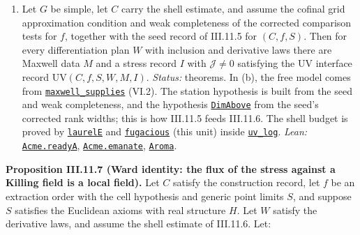 \documentclass[
  letterpaper,
  11pt]{article}
\providecommand{\tightlist}{%
  \setlength{\itemsep}{0pt}\setlength{\parskip}{0pt}}
\begin{document}
\begin{enumerate}
\def\labelenumi{(\alph{enumi})}
\setcounter{enumi}{1}
\tightlist
\item
  Let \(G\) be simple, let \(C\) carry the shell estimate, and assume
  the cofinal grid approximation condition and weak completeness of the
  corrected comparison tests for \(f\), together with the seed record of
  III.11.5 for \((C,f,S)\). Then for every differentiation plan \(W\)
  with inclusion and derivative laws there are Maxwell data \(M\) and a
  stress record \(I\) with \(\mathcal J\ne0\) satisfying the UV
  interface record \(\mathrm{UV}(C,f,S,W,M,I)\). \emph{Status:}
  theorems. In (b), the free model comes from
  \href{https://github.com/yang-mills-group/OpenAI-YM-20261028/blob/3456e5e75cf8d4cd558955a5c7638fba2d68f464/YM/Next/MAXWELL/Lit.lean\#L45-L48}{\texttt{maxwell\_supplies}}
  (VI.2). The station hypothesis is built from the seed and weak
  completeness, and the hypothesis
  \href{https://github.com/yang-mills-group/OpenAI-YM-20261028/blob/3456e5e75cf8d4cd558955a5c7638fba2d68f464/YM/Next/UV_STRESS/Invert.lean\#L108}{\texttt{DimAbove}}
  from the seed's corrected rank widths; this is how III.11.5 feeds
  III.11.6. The shell budget is proved by
  \href{https://github.com/yang-mills-group/OpenAI-YM-20261028/blob/3456e5e75cf8d4cd558955a5c7638fba2d68f464/YM/MergeProof/North/Economist.lean\#L23-L32}{\texttt{laurelE}}
  and
  \href{https://github.com/yang-mills-group/OpenAI-YM-20261028/blob/3456e5e75cf8d4cd558955a5c7638fba2d68f464/YM/MergeProof/North/Economist.lean\#L34}{\texttt{fugacious}}
  (this unit) inside
  \href{https://github.com/yang-mills-group/OpenAI-YM-20261028/blob/3456e5e75cf8d4cd558955a5c7638fba2d68f464/YM/SharpGram/Assembly/Flowers.lean\#L75-L130}{\texttt{uv\_log}}.
  \emph{Lean:}
  \href{https://github.com/yang-mills-group/OpenAI-YM-20261028/blob/3456e5e75cf8d4cd558955a5c7638fba2d68f464/YM/MergeProof/Emanate.lean\#L15-L30}{\texttt{Acme.readyA}},
  \href{https://github.com/yang-mills-group/OpenAI-YM-20261028/blob/3456e5e75cf8d4cd558955a5c7638fba2d68f464/YM/MergeProof/Emanate.lean\#L31-L37}{\texttt{Acme.emanate}},
  \href{https://github.com/yang-mills-group/OpenAI-YM-20261028/blob/3456e5e75cf8d4cd558955a5c7638fba2d68f464/YM/MergeProof/West/Ozone.lean\#L16-L19}{\texttt{Aroma}}.
\end{enumerate}

\textbf{Proposition III.11.7 (Ward identity: the flux of the stress
against a Killing field is a local field).} Let \(C\) satisfy the
construction record, let \(f\) be an extraction order with the cell
hypothesis and generic point limits \(S\), and suppose \(S\) satisfies
the Euclidean axioms with real structure \(H\). Let \(W\) satisfy the
derivative laws, and assume the shell estimate of III.11.6. Let:
\end{document}

